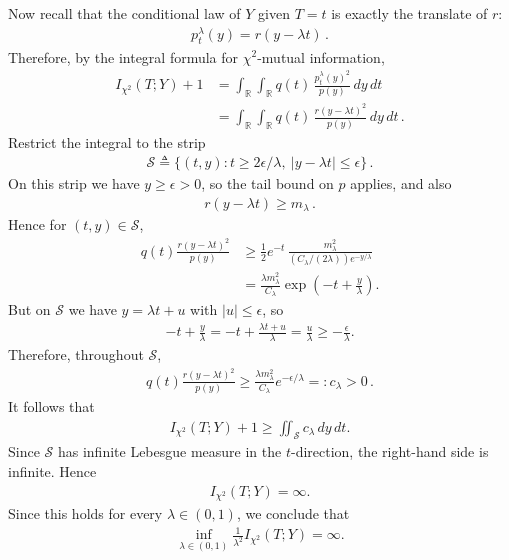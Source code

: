 \documentclass{article}
\theoremstyle{plain}
\theoremstyle{definition}
\theoremstyle{plain}
\begin{document}
Now recall that the conditional law of $Y$ given $T=t$ is exactly the translate of $r$:
\begin{align}
    p_t^\lambda(y)=r(y-\lambda t)\,.
\end{align}
Therefore, by the integral formula for $\chi^2$-mutual information,
\begin{align}
    I_{\chi^2}(T;Y)+1
     & = \int_{\mathbb R}\int_{\mathbb R}
    q(t)\,\frac{p_t^\lambda(y)^2}{p(y)}\,dy\,dt \\
     & = \int_{\mathbb R}\int_{\mathbb R}
    q(t)\,\frac{r(y-\lambda t)^2}{p(y)}\,dy\,dt\,.
\end{align}
Restrict the integral to the strip
\begin{align}
    \mathcal S \triangleq \{(t,y): t\ge 2\epsilon/\lambda,\ |y-\lambda t|\le \epsilon\}\,.
\end{align}
On this strip we have $y\ge \epsilon>0$, so the tail bound on $p$ applies, and also
\begin{align}
    r(y-\lambda t)\ge m_\lambda\,.
\end{align}
Hence for $(t,y)\in\mathcal S$,
\begin{align}
    q(t)\frac{r(y-\lambda t)^2}{p(y)}
     & \ge \frac12 e^{-t}\,
    \frac{m_\lambda^2}{(C_\lambda/(2\lambda))e^{-y/\lambda}} \\
     & = \frac{\lambda m_\lambda^2}{C_\lambda}
    \exp\!\left(-t+\frac{y}{\lambda}\right).
\end{align}
But on $\mathcal S$ we have $y=\lambda t + u$ with $|u|\le \epsilon$, so
\begin{align}
    -t+\frac{y}{\lambda}
    = -t + \frac{\lambda t + u}{\lambda}
    = \frac{u}{\lambda}
    \ge -\frac{\epsilon}{\lambda}.
\end{align}
Therefore, throughout $\mathcal S$,
\begin{align}
    q(t)\frac{r(y-\lambda t)^2}{p(y)}
    \ge \frac{\lambda m_\lambda^2}{C_\lambda}e^{-\epsilon/\lambda}
    =: c_\lambda > 0\,.
\end{align}
It follows that
\begin{align}
    I_{\chi^2}(T;Y)+1
    \ge \iint_{\mathcal S} c_\lambda\,dy\,dt.
\end{align}
Since $\mathcal S$ has infinite Lebesgue measure in the $t$-direction, the right-hand side is infinite. Hence
\begin{align}
    I_{\chi^2}(T;Y)=\infty.
\end{align}
Since this holds for every $\lambda\in(0,1)$, we conclude that
\begin{align}
    \inf_{\lambda\in(0,1)} \frac{1}{\lambda^2} I_{\chi^2}(T;Y)=\infty.
\end{align}
\end{document}
